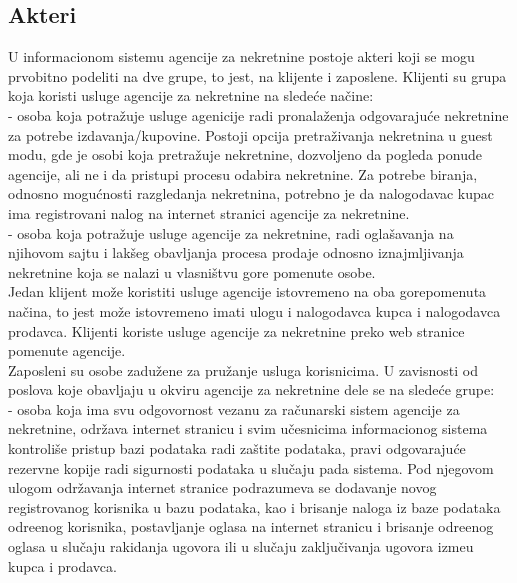 \documentclass{article}
\begin{document}
\newpage
\subsection{\bfseries Akteri}

\indent U informacionom sistemu agencije za nekretnine postoje akteri koji se mogu prvobitno podeliti na dve grupe, to jest, na klijente i zaposlene. Klijenti su grupa koja koristi usluge agencije za nekretnine na slede\' ce na\v {c}ine:\\

 - osoba koja potra\v {z}uje usluge agenicije radi pronala\v {z}enja odgovaraju\' ce nekretnine za potrebe izdavanja/kupovine. Postoji opcija pretra\v {z}ivanja nekretnina u guest modu, gde je osobi koja pretra\v {z}uje nekretnine, dozvoljeno da pogleda ponude agencije, ali ne i da pristupi procesu odabira nekretnine. Za potrebe biranja, odnosno mogu\' cnosti razgledanja nekretnina, potrebno je da nalogodavac kupac ima registrovani nalog na internet stranici agencije za nekretnine.\\

 - osoba koja potra\v {z}uje usluge agencije za nekretnine, radi ogla\v {s}avanja na njihovom sajtu i lak\v {s}eg obavljanja procesa prodaje odnosno iznajmljivanja nekretnine koja se nalazi u vlasni\v {s}tvu gore pomenute osobe.\\

Jedan klijent mo\v {z}e koristiti usluge agencije istovremeno na oba gorepomenuta na\v {c}ina, to jest mo\v {z}e istovremeno imati ulogu i nalogodavca kupca i nalogodavca prodavca. Klijenti koriste usluge agencije za nekretnine preko web stranice pomenute agencije.\\

\indent Zaposleni su osobe zadu\v {z}ene za pru\v {z}anje usluga korisnicima. U zavisnosti od poslova koje obavljaju u okviru agencije za nekretnine dele se na slede\' ce grupe:\\

 - osoba koja ima svu odgovornost vezanu za ra\v {c}unarski sistem agencije za nekretnine, odr\v {z}ava internet stranicu i svim u\v {c}esnicima informacionog sistema kontroli\v {s}e pristup bazi podataka radi za\v {s}tite podataka, pravi odgovaraju\' ce rezervne kopije radi sigurnosti podataka u slu\v {c}aju pada sistema. Pod njegovom ulogom odr\v {z}avanja internet stranice podrazumeva se dodavanje novog registrovanog korisnika u bazu podataka, kao i brisanje naloga iz baze podataka odre\dj enog korisnika, postavljanje oglasa na internet stranicu i brisanje odre\dj enog oglasa u slu\v {c}aju rakidanja ugovora ili u slu\v {c}aju zaklju\v {c}ivanja ugovora izme\dj u kupca i prodavca.\\
\end{document}
